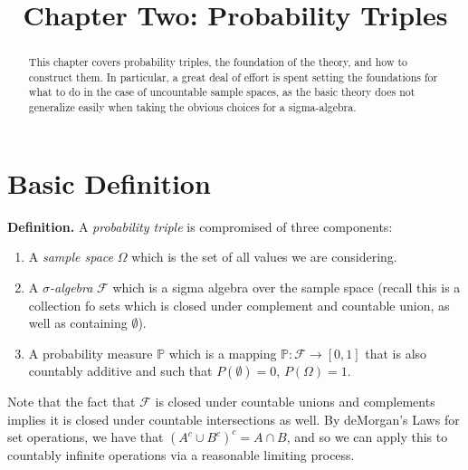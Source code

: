 \documentclass{article}
\begin{document}
\title{Chapter Two: Probability Triples}

\maketitle

\medskip 


\begin{abstract}

This chapter covers probability triples, the foundation of the theory, and how to construct them. In particular, a great deal of effort is spent setting the foundations for what to do in the case of uncountable sample spaces, as the basic theory does not generalize easily when taking the obvious choices for a sigma-algebra. 

\end{abstract}

\bigskip

\section{Basic Definition} 

\noindent \textbf{Definition.} A \emph{probability triple} is compromised of three components:

\begin{enumerate}

\item A \emph{sample space} $\Omega$ which is the set of all values we are considering.

\item A \emph{$\sigma$-algebra} $\mathcal{F}$ which is a sigma algebra over the sample space (recall this is a collection fo sets which is closed under complement and countable union, as well as containing $\emptyset$). 

\item A probability measure $\mathbb{P}$ which is a mapping $\mathbb{P}:\mathcal{F} \to [0,1]$ that is also countably additive and such that $P(\emptyset) = 0$, $P(\Omega) = 1$. 

\end{enumerate}

Note that the fact that $\mathcal{F}$ is closed under countable unions and complements implies it is closed under countable intersections as well. By deMorgan's Laws for set operations, we have that $(A^c \cup B^c)^c = A \cap B$, and so we can apply this to countably infinite operations via a reasonable limiting process. 
\end{document}
